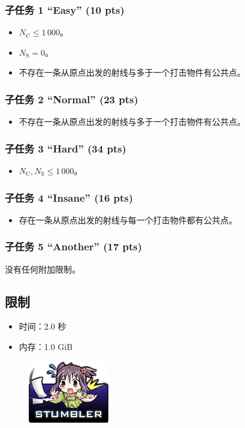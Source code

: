 \documentclass[UTF8, 11pt, a4paper]{article}
\begin{document}
\subsubsection*{子任务 1 “Easy” (10 pts)}
\begin{itemize}
    \item $N_\mathrm{C} \leq 1\,000$。
    \item $N_\mathrm{S} = 0$。
    \item 不存在一条从原点出发的射线与多于一个打击物件有公共点。
\end{itemize}
\subsubsection*{子任务 2 “Normal” (23 pts)}
\begin{itemize}
    \item 不存在一条从原点出发的射线与多于一个打击物件有公共点。
\end{itemize}
\subsubsection*{子任务 3 “Hard” (34 pts)}
\begin{itemize}
    \item $N_\mathrm{C}, N_\mathrm{S} \leq 1\,000$。
\end{itemize}
\subsubsection*{子任务 4 “Insane” (16 pts)}
\begin{itemize}
    \item 存在一条从原点出发的射线与每一个打击物件都有公共点。
\end{itemize}
\subsubsection*{子任务 5 “Another” (17 pts)}
    没有任何附加限制。

\subsection*{限制}
\begin{itemize}
\item 时间：2.0 秒
\item 内存：1.0 GiB
\end{itemize}

\begin{figure}[h]\centering
\includegraphics[scale=0.55]{stumbler.png}
\end{figure}
\end{document}
